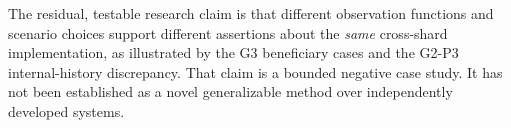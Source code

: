 The residual, testable research claim is that different observation
functions and scenario choices support different assertions about the
\emph{same} cross-shard implementation, as illustrated by the G3
beneficiary cases and the G2-P3 internal-history discrepancy. That
claim is a bounded negative case study. It has not been established
as a novel generalizable method over independently developed systems.
